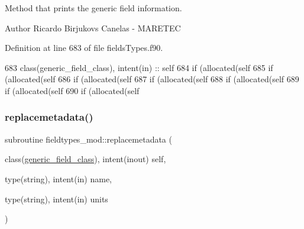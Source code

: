 Method that prints the generic field information. 

\begin{DoxyAuthor}{Author}
Ricardo Birjukovs Canelas -\/ M\+A\+R\+E\+T\+EC 
\end{DoxyAuthor}


Definition at line 683 of file fields\+Types.\+f90.


\begin{DoxyCode}
683     \textcolor{keywordtype}{class}(generic\_field\_class), \textcolor{keywordtype}{intent(in)} :: self
684     \textcolor{keywordflow}{if} (\textcolor{keyword}{allocated}(self%
685     \textcolor{keywordflow}{if} (\textcolor{keyword}{allocated}(self%
686     \textcolor{keywordflow}{if} (\textcolor{keyword}{allocated}(self%
687     \textcolor{keywordflow}{if} (\textcolor{keyword}{allocated}(self%
688     \textcolor{keywordflow}{if} (\textcolor{keyword}{allocated}(self%
689     \textcolor{keywordflow}{if} (\textcolor{keyword}{allocated}(self%
690     \textcolor{keywordflow}{if} (\textcolor{keyword}{allocated}(self%
\end{DoxyCode}
\mbox{\label{namespacefieldtypes__mod_ad8f3bf57dafb3eac18e5a3198e36047c}} 
\subsubsection{\texorpdfstring{replacemetadata()}{replacemetadata()}}
{\footnotesize\ttfamily subroutine fieldtypes\+\_\+mod\+::replacemetadata (\begin{DoxyParamCaption}\item[{class(\mbox{\hyperlink{structfieldtypes__mod_1_1generic__field__class}{generic\+\_\+field\+\_\+class}}), intent(inout)}]{self,  }\item[{type(string), intent(in)}]{name,  }\item[{type(string), intent(in)}]{units }\end{DoxyParamCaption})\hspace{0.3cm}{\ttfamily [private]}}



